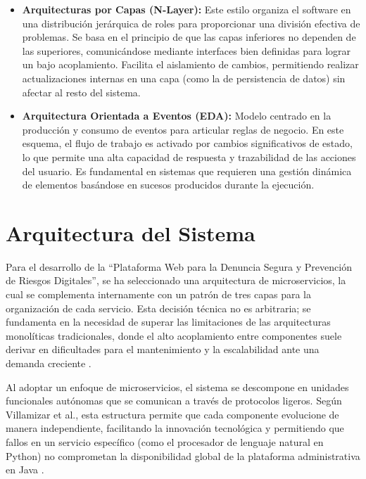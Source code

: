 \begin{itemize}
\item \textbf{Arquitecturas por Capas (N-Layer):} Este estilo organiza el software en una distribución jerárquica de roles para proporcionar una división efectiva de problemas. Se basa en el principio de que las capas inferiores no dependen de las superiores, comunicándose mediante interfaces bien definidas para lograr un bajo acoplamiento. Facilita el aislamiento de cambios, permitiendo realizar actualizaciones internas en una capa (como la de persistencia de datos) sin afectar al resto del sistema.

\item \textbf{Arquitectura Orientada a Eventos (EDA):} Modelo centrado en la producción y consumo de eventos para articular reglas de negocio. En este esquema, el flujo de trabajo es activado por cambios significativos de estado, lo que permite una alta capacidad de respuesta y trazabilidad de las acciones del usuario. Es fundamental en sistemas que requieren una gestión dinámica de elementos basándose en sucesos producidos durante la ejecución.

\end{itemize}

\section{Arquitectura del Sistema}

Para el desarrollo de la “Plataforma Web para la Denuncia Segura y Prevención de Riesgos Digitales”, se ha seleccionado una arquitectura de microservicios, la cual se complementa internamente con un patrón de tres capas para la organización de cada servicio. Esta decisión técnica no es arbitraria; se fundamenta en la necesidad de superar las limitaciones de las arquitecturas monolíticas tradicionales, donde el alto acoplamiento entre componentes suele derivar en dificultades para el mantenimiento y la escalabilidad ante una demanda creciente \cite{30} .

Al adoptar un enfoque de microservicios, el sistema se descompone en unidades funcionales autónomas que se comunican a través de protocolos ligeros. Según Villamizar et al., esta estructura permite que cada componente evolucione de manera independiente, facilitando la innovación tecnológica y permitiendo que fallos en un servicio específico (como el procesador de lenguaje natural en Python) no comprometan la disponibilidad global de la plataforma administrativa en Java \cite{31} .

